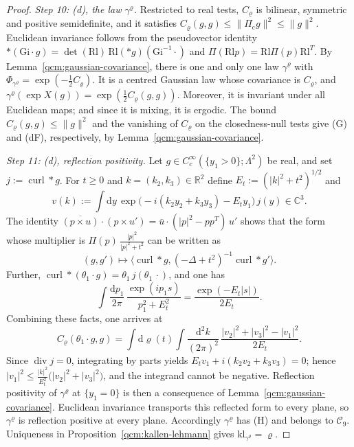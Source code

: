 \documentclass[11pt,letterpaper,reqno]{amsart}
\theoremstyle{definition}
\begin{document}
\begin{proof}
\emph{Step 10: (d), the law $\gamma^\varrho$.}
Restricted to real tests, $C_\varrho$ is bilinear, symmetric and positive semidefinite, and it satisfies $C_\varrho(g,g)\le\|\Pi_{\mathrm c}g\|^2\le\|g\|^2$.
Euclidean invariance follows from the pseudovector identity $\ast(\mathrm{Gi}\cdot g)=\det(\mathrm{Rl})\,\mathrm{Rl}(\ast g)(\mathrm{Gi}^{-1}\cdot)$ and $\Pi(\mathrm{Rl}p)=\mathrm{Rl}\Pi(p)\mathrm{Rl}^T$.
By Lemma~\ref{qcm:gaussian-covariance}, there is one and only one law $\gamma^\varrho$ with $\Phi_{\gamma^\varrho}=\exp(-\frac12C_\varrho)$.
It is a centred Gaussian law whose covariance is $C_\varrho$, and $\gamma^\varrho(\exp X(g))=\exp(\frac12C_\varrho(g,g))$.
Moreover, it is invariant under all Euclidean maps; and since it is mixing, it is ergodic.
The bound $C_\varrho(g,g)\le\|g\|^2$ and the vanishing of $C_\varrho$ on the closedness-null tests give (G) and (dF), respectively, by Lemma~\ref{qcm:gaussian-covariance}.

\emph{Step 11: (d), reflection positivity.}
Let $g\in C_c^\infty(\{y_1>0\};\Lambda^2)$ be real, and set $j:=\operatorname{curl}\ast g$.
For $t\ge0$ and $k=(k_2,k_3)\in\mathbb R^2$ define $E_t:=(|k|^2+t^2)^{1/2}$ and
\begin{equation*}
v(k):=\int\mathrm dy\,\exp\bigl(-i(k_2y_2+k_3y_3)-E_ty_1\bigr)\,j(y)\in\mathbb C^3.
\end{equation*}
The identity $\overline{(p\times u)}\cdot(p\times u')=\allowbreak \bar u\cdot(|p|^2-pp^T)\,\allowbreak u'$ shows that the form whose multiplier is $\Pi(p)\,\frac{|p|^2}{|p|^2+t^2}$ can be written as
\begin{equation*}
(g,g')\mapsto\bigl\langle\operatorname{curl}\ast g,(-\Delta+t^2)^{-1}\operatorname{curl}\ast g'\bigr\rangle.
\end{equation*}
Further, $\operatorname{curl}\ast(\theta_1\cdot g)=\allowbreak \theta_1\,\allowbreak j(\theta_1\,\allowbreak \cdot)$, and one has
\begin{equation*}
\int\frac{\mathrm dp_1}{2\pi}\,\frac{\exp(ip_1s)}{p_1^2+E_t^2}=\frac{\exp(-E_t|s|)}{2E_t}.
\end{equation*}
Combining these facts, one arrives at
\begin{equation*}
C_\varrho(\theta_1\cdot g,g)=\int\mathrm d\varrho(t)\int\frac{\mathrm d^2k}{(2\pi)^2}\,\frac{|v_2|^2+|v_3|^2-|v_1|^2}{2E_t}.
\end{equation*}
Since $\operatorname{div}j=0$, integrating by parts yields $E_tv_1+i(k_2v_2+k_3v_3)=0$; hence $|v_1|^2\le\frac{|k|^2}{E_t^2}\bigl(|v_2|^2+|v_3|^2\bigr)$, and the integrand cannot be negative.
Reflection positivity of $\gamma^\varrho$ at $\{y_1=0\}$ is then a consequence of Lemma~\ref{qcm:gaussian-covariance}.
Euclidean invariance transports this reflected form to every plane, so $\gamma^\varrho$ is reflection positive at every plane.
Accordingly $\gamma^\varrho$ has (H) and belongs to $\mathcal C_9$. Uniqueness in Proposition~\ref{qcm:kallen-lehmann} gives $\mathrm{kl}_{\gamma^\varrho}=\varrho$.


\end{proof}
\end{document}
